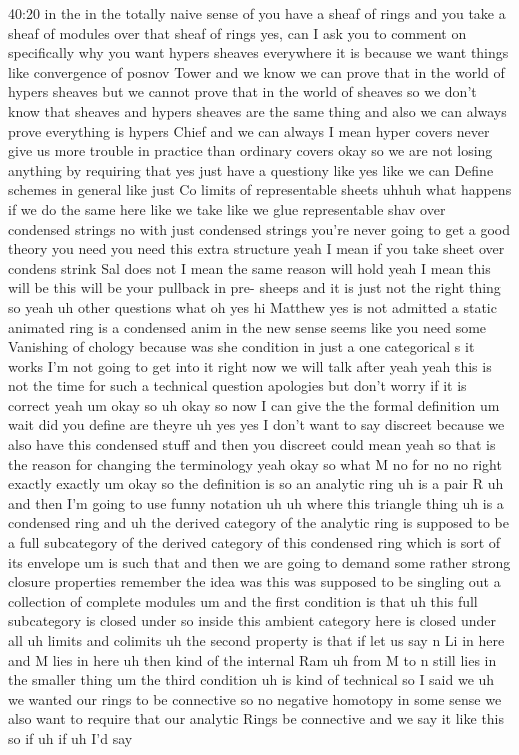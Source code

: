 \begin{unfinished}{40:20}
in the in the totally naive sense of you have a sheaf of rings and you take a sheaf of modules over that sheaf of rings yes, can I ask you to comment on specifically why you want hypers sheaves everywhere it is because we want things like convergence of posnov Tower and we know we can prove that in the world of hypers sheaves but we cannot prove that in the world of sheaves so we don't know that sheaves and hypers sheaves are the same thing and also we can always prove everything is hypers Chief and we can always I mean hyper covers never give us more trouble in practice than ordinary covers okay so we are not losing anything by requiring that yes just have a questiony like yes like we can Define schemes in general like just Co limits of representable sheets uhhuh what happens if we do the same here like we take like we glue representable shav over condensed strings no with just condensed strings you're never going to get a good theory you need you need this extra structure yeah I mean if you take sheet over condens strink Sal does not I mean the same reason will hold yeah I mean this will be this will be your pullback in pre- sheeps and it is just not the right thing so yeah uh other questions what oh yes hi Matthew yes is not admitted a static animated ring is a condensed anim in the new sense seems like you need some Vanishing of chology because was she condition in just a one categorical s it works I'm not going to get into it right now we will talk after yeah yeah this is not the time for such a technical question apologies but don't worry if it is correct yeah um okay so uh okay so now I can give the the formal definition um wait did you define are theyre uh yes yes I don't want to say discreet because we also have this condensed stuff and then you discreet could mean yeah so that is the reason for changing the terminology yeah okay so what M no for no no right exactly exactly um okay so the definition is so an analytic ring uh is a pair R uh and then I'm going to use funny notation uh uh where this triangle thing uh is a condensed ring and uh the derived category of the analytic ring is supposed to be a full subcategory of the derived category of this condensed ring which is sort of its envelope um is such that and then we are going to demand some rather strong closure properties remember the idea was this was supposed to be singling out a collection of complete modules um and the first condition is that uh this full subcategory is closed under so inside this ambient category here is closed under all uh limits and colimits uh the second property is that if let us say n Li in here and M lies in here uh then kind of the internal Ram uh from M to n still lies in the smaller thing um the third condition uh is kind of technical so I said we uh we wanted our rings to be connective so no negative homotopy in some sense we also want to require that our analytic Rings be connective and we say it like this so if uh if uh I'd say


\end{unfinished}
